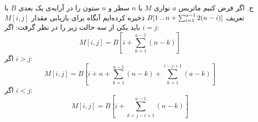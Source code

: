 ج. اگر فرض کنیم ماتریس {$a$} نواری {$M$} با {$n$} سطر و {$n$} ستون را در آرایه‌ی یک بعدی {$B$} با تعریف
 {$B[1\mathinner{\ldotp\ldotp} n+\sum_{i=1}^{a-1}{2(n-i)]}$} ذخیره کرده‌ایم آنگاه برای بازیابی مقدار {$M[i,j]$} باید یکی از سه حالت زیر را در نظر گرفت:
 اگر {$i=j$}:
\begin{displaymath}
M[i,j]=B[i+\sum_{k=1}^{a-1}{(n-k)}]
\end{displaymath}
 اگر {$i>j$}:
\begin{displaymath}
M[i,j]=B[i+n+\sum_{k=1}^{a-1}{(n-k)}+\sum_{k=1}^{i-j+1}{(a-k)}]
\end{displaymath}
 اگر {$i<j$}:
\begin{displaymath}
M[i,j]=B[i+\sum_{k=j-i+1}^{a-1}{(n-k)}]
\end{displaymath}
